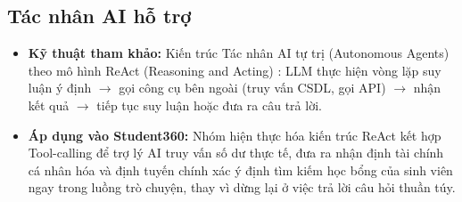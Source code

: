 \subsection{Tác nhân AI hỗ trợ}
\begin{itemize}
    \item \textbf{Kỹ thuật tham khảo:} Kiến trúc Tác nhân AI tự trị (Autonomous Agents) \cite{wang2023survey-agent} theo mô hình ReAct (Reasoning and Acting) \cite{yao2022-react}: LLM thực hiện vòng lặp suy luận ý định $\rightarrow$ gọi công cụ bên ngoài (truy vấn CSDL, gọi API) $\rightarrow$ nhận kết quả $\rightarrow$ tiếp tục suy luận hoặc đưa ra câu trả lời.
    \item \textbf{Áp dụng vào Student360:} Nhóm hiện thực hóa kiến trúc ReAct kết hợp Tool-calling để trợ lý AI truy vấn số dư thực tế, đưa ra nhận định tài chính cá nhân hóa và định tuyến chính xác ý định tìm kiếm học bổng của sinh viên ngay trong luồng trò chuyện, thay vì dừng lại ở việc trả lời câu hỏi thuần túy.
\end{itemize}

